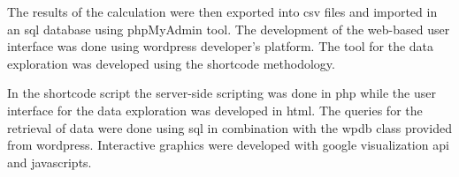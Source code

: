 The results of the calculation were then exported into csv files and imported
in an sql database using phpMyAdmin tool. The development of the web-based user interface was done using wordpress developer's platform. The tool for the data exploration was developed using the shortcode methodology.

In the shortcode script the server-side scripting was done in php while the user interface for the data exploration was developed in html. The queries for the retrieval of data were done using sql in combination with the wpdb class provided from wordpress. Interactive graphics were developed with google visualization api and javascripts.

